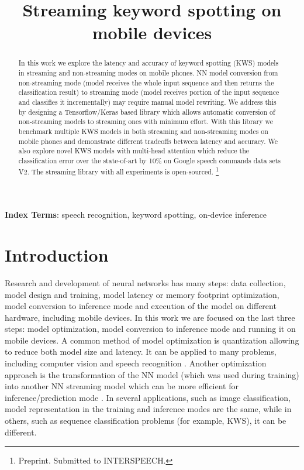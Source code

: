 \documentclass[a4paper]{article}
\title{Streaming keyword spotting on mobile devices}
\begin{document}
\let\<\textless
\let\>\textgreater

\maketitle
\begin{abstract}
In this work we explore the latency and accuracy of keyword spotting (KWS) models in streaming and non-streaming modes on mobile phones. NN model conversion from non-streaming mode (model receives the whole input sequence and then returns the classification result) to streaming mode (model receives portion of the input sequence and classifies it incrementally) may require manual model rewriting. We address this by designing a Tensorflow/Keras based library which allows automatic conversion of non-streaming models to streaming ones with minimum effort. With this library we benchmark multiple KWS models in both streaming and non-streaming modes on mobile phones and demonstrate different tradeoffs between latency and accuracy. We also explore novel KWS models with multi-head attention which reduce the classification error over the state-of-art by 10\% on Google speech commands data sets V2. The streaming library with all experiments is open-sourced.
\footnote{Preprint. Submitted to INTERSPEECH.} \end{abstract}
\noindent\textbf{Index Terms}: speech recognition, keyword spotting, on-device inference

\section{Introduction}

Research and development of neural networks has many steps: data collection, model design and training, model latency or memory footprint optimization, model conversion to inference mode and execution of the model on different hardware, including mobile devices. In this work we are focused on the last three steps: model optimization, model conversion to inference mode and running it on mobile devices. A common method of model optimization is quantization \cite{QUANT1, QUANT2} allowing to reduce both model size and latency. It can be applied to many problems, including computer vision \cite{QUANT1} and speech recognition \cite{STREAM_ASR}. Another optimization approach is the transformation of the NN model (which was used during training) into another NN streaming model which can be more efficient for inference/prediction mode \cite{STREAM_CONV}. In several applications, such as image classification, model representation in the training and inference modes are the same, while in others, such as sequence classification problems (for example, KWS), it can be different.
\end{document}
